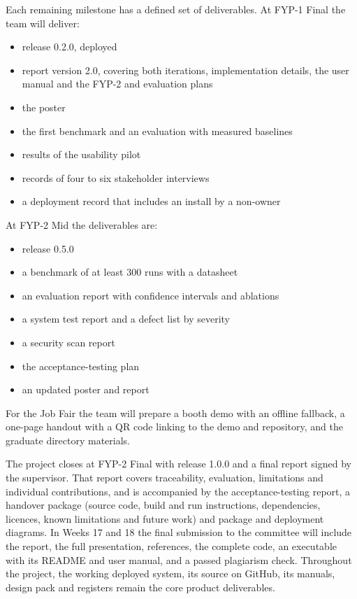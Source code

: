 \documentclass{fast-nuces-bs}
\begin{document}
Each remaining milestone has a defined set of deliverables. At FYP-1 Final the team will deliver:

\begin{itemize}
\item release 0.2.0, deployed
\item report version 2.0, covering both iterations, implementation details, the user manual and the FYP-2 and evaluation plans
\item the poster
\item the first benchmark and an evaluation with measured baselines
\item results of the usability pilot
\item records of four to six stakeholder interviews
\item a deployment record that includes an install by a non-owner
\end{itemize}

At FYP-2 Mid the deliverables are:

\begin{itemize}
\item release 0.5.0
\item a benchmark of at least 300 runs with a datasheet
\item an evaluation report with confidence intervals and ablations
\item a system test report and a defect list by severity
\item a security scan report
\item the acceptance-testing plan
\item an updated poster and report
\end{itemize}

For the Job Fair the team will prepare a booth demo with an offline fallback, a one-page handout with a QR code linking to the demo and repository, and the graduate directory materials.

The project closes at FYP-2 Final with release 1.0.0 and a final report signed by the supervisor. That report covers traceability, evaluation, limitations and individual contributions, and is accompanied by the acceptance-testing report, a handover package (source code, build and run instructions, dependencies, licences, known limitations and future work) and package and deployment diagrams. In Weeks 17 and 18 the final submission to the committee will include the report, the full presentation, references, the complete code, an executable with its README and user manual, and a passed plagiarism check. Throughout the project, the working deployed system, its source on GitHub, its manuals, design pack and registers remain the core product deliverables.
\end{document}
